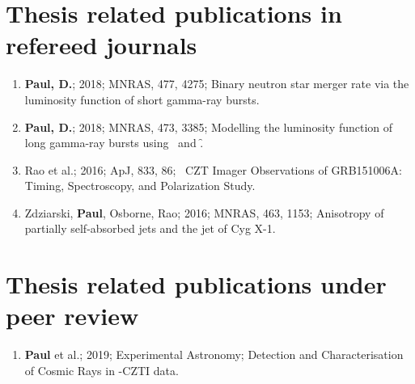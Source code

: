 \section*{Thesis related publications in refereed journals}


\begin{enumerate}

\item \textbf{Paul, D.}; 2018; MNRAS, 477, 4275; Binary neutron star merger rate via the luminosity function of short gamma-ray bursts.

\item \textbf{Paul, D.}; 2018; MNRAS, 473, 3385; Modelling the luminosity function of long gamma-ray bursts using \s\ and \f.

\item Rao et al.; 2016; ApJ, 833, 86; \AS\ CZT Imager Observations of GRB151006A: Timing, Spectroscopy, and Polarization Study.

\item Zdziarski, \textbf{Paul}, Osborne, Rao; 2016; MNRAS, 463, 1153; Anisotropy of partially self-absorbed jets and the jet of Cyg X-1.

\end{enumerate}



\section*{Thesis related publications under peer review}


\begin{enumerate}

\item \textbf{Paul} et al.; 2019; Experimental Astronomy; Detection and Characterisation of Cosmic Rays in \AS -CZTI data.

\end{enumerate}